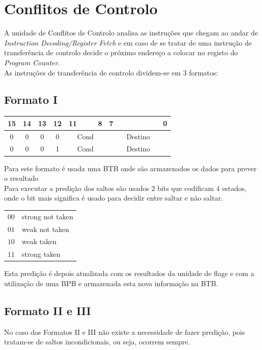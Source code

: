 \chapter{Conflitos de Controlo}
A unidade de Conflitos de Controlo analisa as instruções que chegam ao andar de \textit{Instruction Decoding/Register Fetch} e em caso de se tratar de uma instrução de transferência de controlo decide o próximo endereço a colocar no registo do \textit{Program Counter}.\\

As instruções de transferência de controlo dividem-se em 3 formatos:\\

\section{Formato I}
\begin{table}[H]
	\centering
	\begin{tabular}{cccccccccccccccc}
		15 & 14 & 13 & 12 & 11 &  &  & 8 & 7 &  &  &  &  &  &  & 0 \\ \hline
		\multicolumn{1}{|c}{0} & \multicolumn{1}{c|}{0} & 0 & \multicolumn{1}{c|}{0} & \multicolumn{4}{c|}{Cond} & \multicolumn{8}{c|}{Destino} \\ \hline
		\multicolumn{1}{|c}{0} & \multicolumn{1}{c|}{0} & 0 & \multicolumn{1}{c|}{1} & \multicolumn{4}{c|}{Cond} & \multicolumn{8}{c|}{Destino} \\ \hline
	\end{tabular}
\end{table}
Para este formato é usada uma BTB onde são armazenados os dados para prever o resultado \\
Para executar a predição dos saltos são usados 2 bits que codificam 4 estados, onde o bit mais significa é usado para decidir entre saltar e não saltar.
\begin{table}[H]
	\begin{tabular}{ll}
		$00$ & strong not taken	\\
		$01$ & weak not taken	\\
		$10$ & weak taken		\\
		$11$ & strong taken
	\end{tabular}
\end{table}
Esta predição é depois atualizada com os resultados da unidade de flags e com a utilização de uma BPB e armazenada esta nova informação na BTB.

\section{Formato II e III}
No caso dos Formatos II e III não existe a necessidade de fazer predição, pois tratam-se de saltos incondicionais, ou seja, ocorrem sempre.\\

